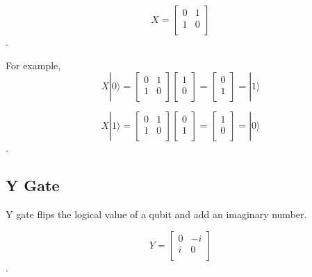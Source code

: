\begin{equation}
X = \begin{bmatrix}
0 & 1 \\
1 & 0 \\
\end{bmatrix}
\end{equation}.

For example,
\begin{equation}
X|0\rangle = \begin{bmatrix}
0 & 1 \\
1 & 0 \\
\end{bmatrix} 
\left[
\begin{array}{c}
1 \\
0 \\
\end{array}
\right]
= \left[
\begin{array}{c}
0 \\
1 \\
\end{array}
\right]
= |1\rangle
\end{equation}

\begin{equation}
 X|1\rangle = \begin{bmatrix}
0 & 1 \\
1 & 0 \\
\end{bmatrix} 
\left[
\begin{array}{c}
0 \\
1  \\
\end{array}
\right]
= \left[
\begin{array}{c}
1 \\
0 \\
\end{array}
\right]
= |0\rangle
\end{equation}.

\subsection{Y Gate}

Y gate flips the logical value of a qubit and add an imaginary number.

\begin{equation}
 Y = \begin{bmatrix}
0 & -i \\
i & 0 \\
\end{bmatrix}
\end{equation}.


